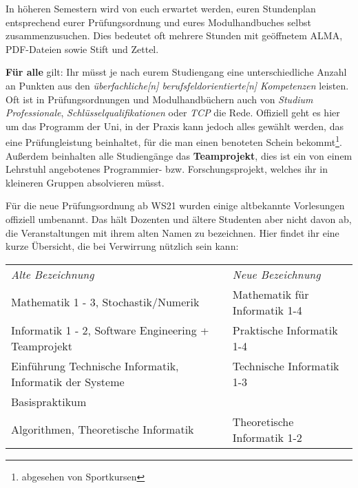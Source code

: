 In höheren Semestern wird von euch erwartet werden, euren Stundenplan
entsprechend eurer Prüfungsordnung und eures Modulhandbuches selbst
zusammenzusuchen. Dies bedeutet oft mehrere Stunden mit geöffnetem ALMA,
PDF-Dateien sowie Stift und Zettel. 

\textbf{Für alle} gilt: Ihr müsst je nach eurem Studiengang eine
unterschiedliche Anzahl an Punkten aus den \emph{überfachliche[n]
berufsfeldorientierte[n] Kompetenzen} leisten. Oft ist in Prüfungsordnungen und
Modulhandbüchern auch von \emph{Studium Professionale},
\emph{Schlüsselqualifikationen} oder \emph{TCP} die Rede. Offiziell geht es
hier um das Programm der Uni, in der Praxis kann jedoch alles gewählt werden,
das eine Prüfungleistung beinhaltet, für die man einen benoteten Schein
bekommt\footnote{abgesehen von Sportkursen}. \\
Außerdem beinhalten alle Studiengänge das \textbf{Teamprojekt}, dies ist ein
von einem Lehrstuhl angebotenes Programmier- bzw. Forschungsprojekt, welches
ihr in kleineren Gruppen absolvieren müsst. 

%

Für die neue Prüfungsordnung ab WS21 wurden einige altbekannte Vorlesungen offiziell umbenannt.
Das hält Dozenten und ältere Studenten aber nicht davon ab, die Veranstaltungen mit
ihrem alten Namen zu bezeichnen. Hier findet ihr eine kurze Übersicht, die bei Verwirrung nützlich sein kann:

\begin{tabular}{ll}
\emph{Alte Bezeichnung}						& \emph{Neue Bezeichnung} \\[.4em]
Mathematik 1 - 3, Stochastik/Numerik	& Mathematik für Informatik 1-4 \\[.4em]
Informatik 1 - 2, Software Engineering + Teamprojekt & Praktische Informatik 1-4\\[.4em]
Einführung Technische Informatik, Informatik der Systeme & Technische Informatik 1-3\\
Basispraktikum & \\[.4em]
Algorithmen, Theoretische Informatik	& Theoretische Informatik 1-2 \\[.4em]
\end{tabular}

